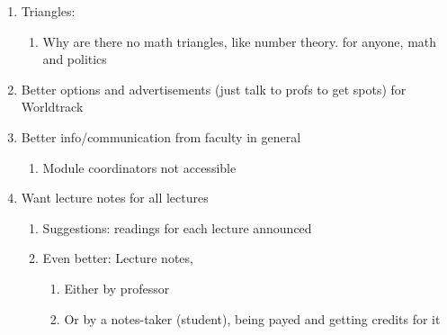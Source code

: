 \begin{enumerate}
\item Triangles:
\begin{enumerate}
\item Why are there no math triangles, like number theory. for anyone, math and politics
\end{enumerate}
\item Better options and advertisements (just talk to profs to get spots) for Worldtrack
\item Better info/communication from faculty in general
\begin{enumerate}
\item Module coordinators not accessible
\end{enumerate}
\item Want lecture notes for all lectures
\begin{enumerate}
\item Suggestions: readings for each lecture announced
\item Even better: Lecture notes,
\begin{enumerate}
\item Either by professor
\item Or by a notes-taker (student), being payed and getting credits for it
\end{enumerate}
\end{enumerate}
\end{enumerate}
